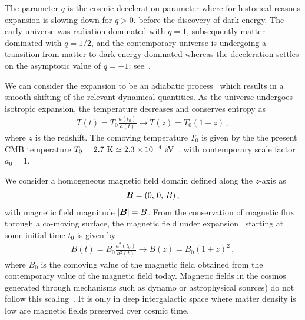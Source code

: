 The parameter $q$ is the cosmic deceleration parameter where for historical reasons expansion is slowing down for $q>0$. before the discovery of dark energy. The early universe was radiation dominated with $q = 1$, subsequently matter dominated with $q = 1/2$, and the contemporary universe is undergoing a transition from matter to dark energy dominated whereas the deceleration settles on the asymptotic value of $q = -1$; see~\cite{Rafelski:2013yka}.

We can consider the expansion to be an adiabatic process~\citep{Abdalla:2022yfr} which results in a smooth shifting of the relevant dynamical quantities. As the universe undergoes isotropic expansion, the temperature decreases and conserves entropy as 
\begin{gather}
 \label{tscale}
 T(t)=T_{0}\frac{a(t_{0})}{a(t)}\rightarrow T(z)=T_{0}(1+z)\,,
\end{gather}
where $z$ is the redshift. The comoving temperature $T_{0}$ is given by the the present CMB temperature $T_{0}=2.7{\rm\ K}\simeq2.3\times10^{-4}\eV$~\citep{Planck:2018vyg}, with contemporary scale factor $a_{0}=1$.

We consider a homogeneous magnetic field domain defined along the $z$-axis as
\begin{gather}
    \label{homoB:1}
    \boldsymbol{B}=(0,\,0,\,B)\,,
\end{gather}
with magnetic field magnitude $|\boldsymbol{B}|=B$. From the conservation of magnetic flux through a co-moving surface, the magnetic field under expansion~\citep{Durrer:2013pga} starting at some initial time $t_{0}$ is given by
\begin{gather}
 \label{bscale}
 B(t)=B_{0}\frac{a^{2}(t_{0})}{a^{2}(t)}\rightarrow B(z)=B_{0}\left(1+z\right)^{2}\,,
\end{gather}
where $B_{0}$ is the comoving value of the magnetic field obtained from the contemporary value of the magnetic field today. Magnetic fields in the cosmos generated through mechanisms such as dynamo or astrophysical sources) do not follow this scaling~\citep{Pomakov:2022cem}. It is only in deep intergalactic space where matter density is low are magnetic fields preserved over cosmic time.

